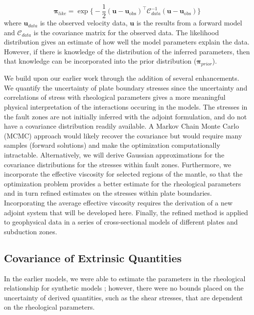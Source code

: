 \documentclass[12pt]{article}
\newcommand{\uu}{{\ensuremath{\boldsymbol{u}}}}
\newcommand{\ppi}{{\ensuremath{\boldsymbol{\pi}}}}
\begin{document}
{\begin{equation}
\ppi_{like} = \exp{\Big\{-\frac{1}{2} (\uu-\uu_{\text{obs}})^\intercal\mathcal{C}^{-1}_{data}(\uu-\uu_{\text{obs}})}\Big\}
\label{eq:like}
\end{equation}
where $\uu_{data}$ is the observed velocity data, $\uu$ is the results from a forward model and $\mathcal{C}_{data}$ is the covariance matrix for the observed data. The likelihood distribution gives an estimate of how well the model parameters explain the data. However, if there is knowledge of the distribution of the inferred parameters, then that knowledge can be incorporated into the prior distribution ($\ppi_{prior}$).

We build upon our earlier work \citep{ratnaswamy2015adjoint} through the addition of several enhancements. We quantify the uncertainty of plate boundary stresses since the uncertainty and correlations of stress with rheological parameters gives a more meaningful physical interpretation of the interactions occuring in the models. The stresses in the fault zones are not initially inferred with the adjoint formulation, and do not have a covariance distribution readily available. A Markov Chain Monte Carlo (MCMC) approach would likely recover the covariance but would require many samples (forward solutions) and make the optimization computationally intractable. Alternatively, we will derive Gaussian approximations for the covariance distributions for the stresses within fault zones.
Furthermore, we incorporate the effective viscosity for selected regions of the mantle, 
so that the optimization problem provides a better estimate for the rheological parameters and in turn refined estimates on the stresses within plate boundaries. Incorporating the average effective viscosity requires the derivation of a new adjoint system that will be developed here. 
Finally, the refined method is applied to geophysical data in a series of cross-sectional models of different plates and subduction zones.


\subsection*{Covariance of Extrinsic Quantities}
 In the earlier models, 
we were able to estimate the parameters in the rheological relationship for synthetic models \citep{ratnaswamy2015adjoint}; 
however, there were no bounds placed on the uncertainty of derived quantities, such as the shear stresses, that are dependent on the rheological parameters.

}
\end{document}

